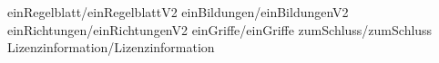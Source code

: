 
 {einRegelblatt/einRegelblattV2}
 {einBildungen/einBildungenV2}
 {einRichtungen/einRichtungenV2}
 {einGriffe/einGriffe}
 {zumSchluss/zumSchluss}
 {Lizenzinformation/Lizenzinformation}

